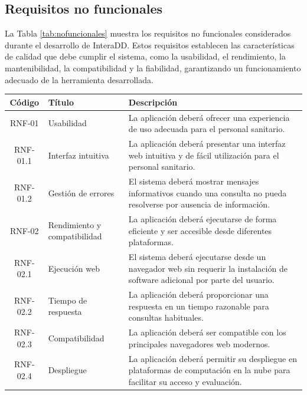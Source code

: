 \subsection*{Requisitos no funcionales}
La Tabla \ref{tab:nofuncionales} muestra los requisitos no funcionales considerados durante el desarrollo de InteraDD. Estos requisitos establecen las características de calidad que debe cumplir el sistema, como la usabilidad, el rendimiento, la mantenibilidad, la compatibilidad y la fiabilidad, garantizando un funcionamiento adecuado de la herramienta desarrollada.
\begin{table}[ht]
\centering
\small
\begin{tabularx}{\textwidth}{c p{4.5cm} X}
\toprule
\textbf{Código} & \textbf{Título} & \textbf{Descripción} \\
\midrule

RNF-01 & Usabilidad &
La aplicación deberá ofrecer una experiencia de uso adecuada para el personal sanitario. \\

RNF-01.1 & Interfaz intuitiva &
La aplicación deberá presentar una interfaz web intuitiva y de fácil utilización para el personal sanitario. \\

RNF-01.2 & Gestión de errores &
El sistema deberá mostrar mensajes informativos cuando una consulta no pueda resolverse por ausencia de información. \\

\midrule

RNF-02 & Rendimiento y compatibilidad &
La aplicación deberá ejecutarse de forma eficiente y ser accesible desde diferentes plataformas. \\

RNF-02.1 & Ejecución web &
El sistema deberá ejecutarse desde un navegador web sin requerir la instalación de software adicional por parte del usuario. \\

RNF-02.2 & Tiempo de respuesta &
La aplicación deberá proporcionar una respuesta en un tiempo razonable para consultas habituales. \\

RNF-02.3 & Compatibilidad &
La aplicación deberá ser compatible con los principales navegadores web modernos. \\

RNF-02.4 & Despliegue &
La aplicación deberá permitir su despliegue en plataformas de computación en la nube para facilitar su acceso y evaluación. \\


\end{tabularx}
\end{table}
